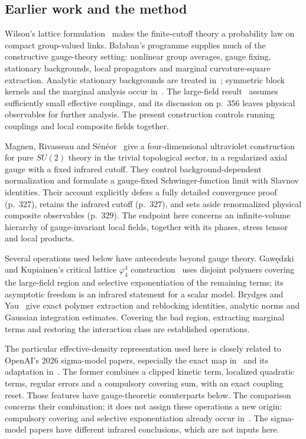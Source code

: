 \subsection{Earlier work and the method}

Wilson's lattice formulation~\cite{Wilson1974} makes the finite-cutoff theory a probability law on compact group-valued links. Ba\l{}aban's programme supplies much of the constructive gauge-theory setting: nonlinear group averages, gauge fixing, stationary backgrounds, local propagators and marginal curvature-square extraction. Analytic stationary backgrounds are treated in~\cite[Theorem~1 and Proposition~6]{Balaban1985Variational}; symmetric block kernels and the marginal analysis occur in~\cite[pp.~252--254 and \S\S4--5]{Balaban1987RG}. The large-field result~\cite[Theorem~1, p.~355]{Balaban1989Large} assumes sufficiently small effective couplings, and its discussion on p.~356 leaves physical observables for further analysis. The present construction controls running couplings and local composite fields together.

Magnen, Rivasseau and S\'en\'eor~\cite{MagnenRivasseauSeneor1993} give a four-dimensional ultraviolet construction for pure $SU(2)$ theory in the trivial topological sector, in a regularized axial gauge with a fixed infrared cutoff. They control background-dependent normalization and formulate a gauge-fixed Schwinger-function limit with Slavnov identities. Their account explicitly defers a fully detailed convergence proof (p.~327), retains the infrared cutoff (p.~327), and sets aside renormalized physical composite observables (p.~329). The endpoint here concerns an infinite-volume hierarchy of gauge-invariant local fields, together with its phases, stress tensor and local products.

Several operations used below have antecedents beyond gauge theory. Gaw\k{e}dzki and Kupiainen's critical lattice $\varphi^4_4$ construction~\cite[p.~212, (4.8), and pp.~218--221]{GawedzkiKupiainen1985} uses disjoint polymers covering the large-field region and selective exponentiation of the remaining terms; its asymptotic freedom is an infrared statement for a scalar model. Brydges and Yau~\cite[\S\S1--2 and pp.~378--384]{BrydgesYau1990} give exact polymer extraction and reblocking identities, analytic norms and Gaussian integration estimates. Covering the bad region, extracting marginal terms and restoring the interaction class are established operations.

The particular effective-density representation used here is closely related to OpenAI's 2026 sigma-model papers, especially the exact map in~\cite[\S5, pp.~38--55]{OpenAI2026O4} and its adaptation in~\cite[\S3.3, pp.~23--28]{OpenAI2026O3}. The former combines a clipped kinetic term, localized quadratic terms, regular errors and a compulsory covering sum, with an exact coupling reset. Those features have gauge-theoretic counterparts below. The comparison concerns their combination; it does not assign these operations a new origin: compulsory covering and selective exponentiation already occur in~\cite[p.~212]{GawedzkiKupiainen1985}. The sigma-model papers have different infrared conclusions, which are not inputs here.

